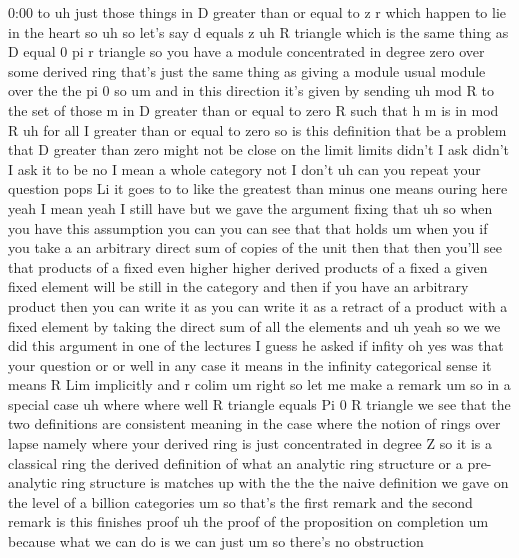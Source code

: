 \begin{unfinished}{0:00}
to  uh  just  those  things  in  D  greater
than  or  equal  to  z  r  which  happen  to  lie
in  the  heart  so
uh
so  let's  say  d  equals
z  uh  R  triangle  which  is  the  same  thing
as  D  equal  0  pi  r  triangle  so  you  have  a
module  concentrated  in  degree  zero  over
some  derived  ring  that's  just  the  same
thing  as  giving  a  module  usual  module
over  the  the  pi
0
so
um  and  in  this  direction  it's  given  by
sending  uh  mod  R  to  the  set  of  those  m
in  D  greater  than  or  equal  to  zero  R
such  that  h  m  is  in  mod
R  uh  for  all  I  greater  than  or  equal  to
zero
so  is  this  definition  that  be  a  problem
that  D  greater  than  zero  might  not  be
close  on  the  limit  limits  didn't  I  ask
didn't  I  ask  it  to  be  no  I  mean  a  whole
category  not  I  don't  uh  can  you  repeat
your  question  pops  Li  it  goes  to  to  like
the  greatest  than  minus
one  means  ouring  here  yeah  I  mean  yeah  I
still  have  but  we  gave  the  argument
fixing  that  uh  so  when  you  have  this
assumption  you  can  you  can  see  that  that
holds  um  when  you  if  you  take  a  an
arbitrary  direct  sum  of  copies  of  the
unit  then  that  then  you'll  see  that
products  of  a  fixed  even  higher  higher
derived  products  of  a  fixed  a  given
fixed  element  will  be  still  in  the
category  and  then  if  you  have  an
arbitrary  product  then  you  can  write  it
as  you  can  write  it  as  a  retract  of  a
product  with  a  fixed  element  by  taking
the  direct  sum  of  all  the  elements  and
uh  yeah  so  we  we  did  this  argument  in
one  of  the
lectures  I  guess  he  asked
if  infity  oh  yes  was  that  your  question
or  or  well  in  any  case  it  means  in  the
infinity  categorical  sense  it  means  R
Lim  implicitly  and  r  colim
um  right  so  let  me  make  a  remark  um  so
in  a  special
case  uh  where  where  well  R  triangle
equals  Pi  0  R  triangle  we  see  that  the
two  definitions  are
consistent  meaning  in  the  case  where  the
notion  of  rings  over  lapse  namely  where
your  derived  ring  is  just  concentrated
in  degree  Z  so  it  is  a  classical  ring
the  derived  definition  of  what  an
analytic  ring  structure  or  a
pre-analytic  ring  structure  is  matches
up  with  the  the  the  naive  definition  we
gave  on  the  level  of  a  billion
categories
um  so  that's  the  first  remark  and  the
second  remark  is  this  finishes
proof  uh  the
proof  of  the
proposition  on
completion  um  because  what  we  can  do  is
we  can  just  um  so  there's  no  obstruction

\end{unfinished}
